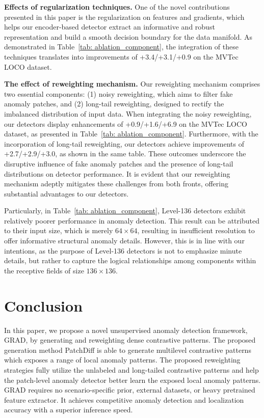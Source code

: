 \documentclass[letterpaper]{article} %
\begin{document}
\textbf{Effects of regularization techniques.} One of the novel contributions presented in this paper is the regularization on features and gradients, which helps our encoder-based detector extract an informative and robust representation and build a smooth decision boundary for the data manifold. As demonstrated in Table~\ref{tab: ablation_component}, the integration of these techniques translates into improvements of +3.4/+3.1/+0.9 on the MVTec LOCO dataset.

\textbf{The effect of reweighting mechanism.} Our reweighting mechanism comprises two essential components: (1) noisy reweighting, which aims to filter fake anomaly patches, and (2) long-tail reweighting, designed to rectify the imbalanced distribution of input data. When integrating the noisy reweighting, our detectors display enhancements of +0.9/+1.6/+6.9 on the MVTec LOCO dataset, as presented in Table~\ref{tab: ablation_component}. Furthermore, with the incorporation of long-tail reweighting, our detectors achieve improvements of +2.7/+2.9/+3.0, as shown in the same table. These outcomes underscore the disruptive influence of fake anomaly patches and the presence of long-tail distributions on detector performance. It is evident that our reweighting mechanism adeptly mitigates these challenges from both fronts, offering substantial advantages to our detectors.

Particularly, in Table~\ref{tab: ablation_component}, Level-136 detectors exhibit relatively poorer performance in anomaly detection. This result can be attributed to their input size, which is merely $64 \times 64$, resulting in insufficient resolution to offer informative structural anomaly details. However, this is in line with our intentions, as the purpose of Level-136 detectors is not to emphasize minute details, but rather to capture the logical relationships among components within the receptive fields of size $136 \times 136$.
    


\section{Conclusion}
In this paper, we propose a novel unsupervised anomaly detection framework, GRAD, by generating and reweighting dense contrastive patterns. The proposed generation method PatchDiff is able to generate multilevel contrastive patterns which exposes a range of local anomaly patterns. The proposed reweighting strategies fully utilize the unlabeled and long-tailed contrastive patterns and help the patch-level anomaly detector better learn the exposed local anomaly patterns. GRAD requires no scenario-specific prior, external datasets, or heavy pretrained feature extractor. It achieves competitive anomaly detection and localization accuracy with a superior inference speed. 
\end{document}
